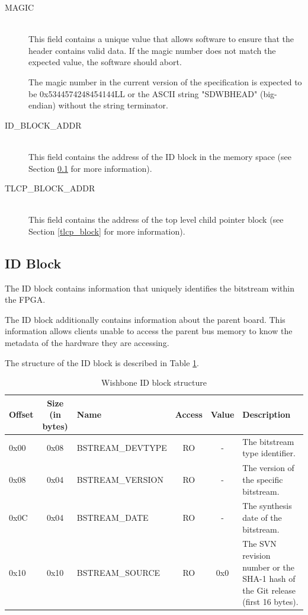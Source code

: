 \documentclass{article}
\begin{document}
\begin{description}
\item[MAGIC] \hfill \\
This field contains a unique value that allows software to ensure that
the header contains valid data. If the magic number does not match the
expected value, the software should abort.

The magic number in the current version of the specification is expected to
be 0x5344574248454144LL or the ASCII string "SDWBHEAD" (big-endian) without the
string terminator.

\item[ID\_BLOCK\_ADDR] \hfill \\
This field contains the address of the ID block in the memory space (see Section
\ref{id_block} for more information).

\item[TLCP\_BLOCK\_ADDR] \hfill \\
This field contains the address of the top level child pointer block (see Section
\ref{tlcp_block} for more information).
\end{description}

\subsection{ID Block}\label{id_block}

The ID block contains information that uniquely identifies the bitstream
within the FPGA.

The ID block additionally contains information about the parent board.
This information allows clients unable to access the parent bus memory
to know the metadata of the hardware they are accessing.

The structure of the ID block is described in Table \ref{id_block_struct}.

\begin{center}
	\begin{savenotes}
	\begin{table}[!ht]\footnotesize
	\caption{Wishbone ID block structure}\label{id_block_struct}\centering
	\begin{tabular}{| l | c | l | c | c | p{5cm} |} \hline
	Offset & Size (in bytes) & Name & Access & Value & Description \\ \hline
	0x00 & 0x08 & BSTREAM\_DEVTYPE & RO & - & The bitstream type identifier. \\ \hline
	0x08 & 0x04 & BSTREAM\_VERSION & RO & - & The version of the specific bitstream. \\ \hline
	0x0C & 0x04 & BSTREAM\_DATE & RO & - & The synthesis date of the bitstream. \\ \hline
	0x10 & 0x10 & BSTREAM\_SOURCE & RO & 0x0 & The SVN revision number or the SHA-1 hash of the Git release (first 16 bytes). \\ \hline
	\end{tabular}
	\end{table}
	\end{savenotes}
\end{center}
\end{document}
